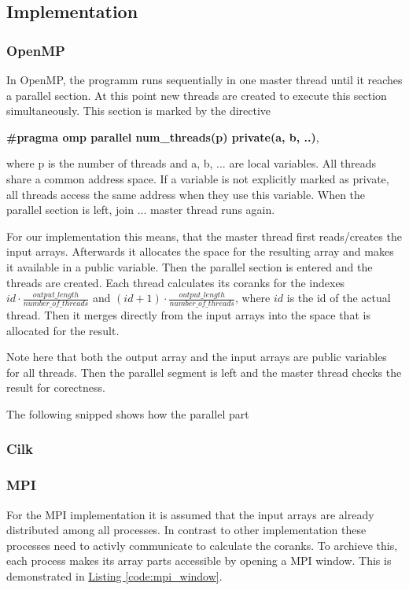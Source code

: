 \subsection{Implementation}

\subsubsection{OpenMP}
In OpenMP, the programm runs sequentially in one master thread until it reaches a parallel section.
At this point new threads are created to execute this section simultaneously.
This section is marked by the directive

\textbf{\#pragma omp parallel num\_threads(p) private(a, b, ..)},

where p is the number of threads and a, b, ... are local variables.
All threads share a common address space.
If a variable is not explicitly marked as private, all threads access the same address when they use this variable.
When the parallel section is left, join ... master thread runs again.

For our implementation this means, that the master thread first reads/creates the input arrays.
Afterwards it allocates the space for the resulting array and makes it available in a public variable.
Then the parallel section is entered and the threads are created.
Each thread calculates its coranks for the indexes
$id \cdot \frac{output\_length}{number\_of\_threads}$
and
$(id+1)\cdot \frac{output\_length}{number\_of\_threads}$, where $id$ is the id of the actual thread.
Then it merges directly from the input arrays into the space that is allocated for the result.

Note here that both the output array and the input arrays are public variables for all threads.
Then the parallel segment is left and the master thread checks the result for corectness.

The following snipped shows how the parallel part


\subsubsection{Cilk}

\subsubsection{MPI}
For the MPI implementation it is assumed that the input arrays are already distributed among all processes.
In contrast to other implementation these processes need to activly communicate to calculate the coranks.
To archieve this, each process makes its array parts accessible by opening a MPI window.
This is demonstrated in \hyperref[code:mpi_window]{Listing \ref*{code:mpi_window}}.

